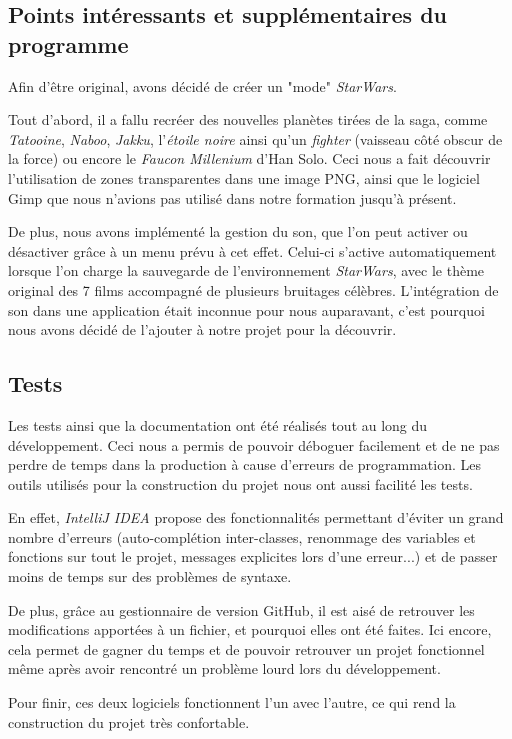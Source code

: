\documentclass[a4paper,10pt]{article}
\begin{document}
\newpage
\subsection{Points intéressants et supplémentaires du programme}
Afin d'être original, avons décidé de créer un "mode" \textit{StarWars}. 

Tout d'abord, il a fallu recréer des nouvelles planètes tirées de la saga, comme \textit{Tatooine}, \textit{Naboo}, \textit{Jakku}, l'\textit{étoile noire} ainsi qu'un \textit{fighter} (vaisseau côté obscur de la force) ou encore le \textit{Faucon Millenium} d'Han Solo. Ceci nous a fait découvrir l'utilisation de zones transparentes dans une image PNG, ainsi que le logiciel Gimp que nous n'avions pas utilisé dans notre formation jusqu'à présent.

De plus, nous avons implémenté la gestion du son, que l'on peut activer ou désactiver grâce à un menu prévu à cet effet. Celui-ci s'active automatiquement lorsque l'on charge la sauvegarde de l'environnement \textit{StarWars}, avec le thème original des 7 films accompagné de plusieurs bruitages célèbres. L'intégration de son dans une application était inconnue pour nous auparavant, c'est pourquoi nous avons décidé de l'ajouter à notre projet pour la découvrir.

\subsection{Tests}
Les tests ainsi que la documentation ont été réalisés tout au long du développement. Ceci nous a permis de pouvoir déboguer facilement et de ne pas perdre de temps dans la production à cause d'erreurs de programmation. Les outils utilisés pour la construction du projet nous ont aussi facilité les tests. 

En effet, \textit{IntelliJ IDEA} propose des fonctionnalités permettant d'éviter un grand nombre d'erreurs (auto-complétion inter-classes, renommage des variables et fonctions sur tout le projet, messages explicites lors d'une erreur...) et de passer moins de temps sur des problèmes de syntaxe. 

De plus, grâce au gestionnaire de version GitHub, il est aisé de retrouver les modifications apportées à un fichier, et pourquoi elles ont été faites. Ici encore, cela permet de gagner du temps et de pouvoir retrouver un projet fonctionnel même après avoir rencontré un problème lourd lors du développement. 

Pour finir, ces deux logiciels fonctionnent l'un avec l'autre, ce qui rend la construction du projet très confortable.
\\
\end{document}
